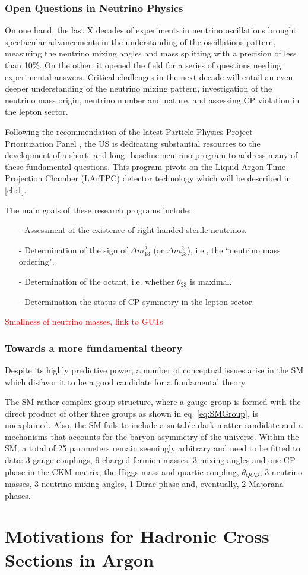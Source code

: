 \subsubsection{Open Questions in Neutrino Physics}
On one hand, the last X decades of experiments in neutrino oscillations brought spectacular advancements in the understanding of the oscillations pattern, measuring the neutrino mixing angles and mass splitting with a precision of less than 10\%.  On the other, it opened the field for a series of questions needing experimental answers. 
Critical challenges in the next decade will entail an even deeper understanding of the neutrino mixing pattern, investigation of the neutrino mass origin, neutrino number and nature, and assessing CP violation in the lepton sector. 


Following the recommendation of the latest Particle Physics Project Prioritization Panel  \cite{P5}, the US  is dedicating substantial resources to the development of a short- and long- baseline neutrino program to address many of these fundamental questions.  This program pivots on the Liquid Argon Time Projection Chamber (LArTPC) detector technology which will be described in \ref{ch:1}.  

The main goals of these research programs include:
\begin{itemize}
\item[-] Assessment of the existence of right-handed sterile neutrinos. 
\item[-] Determination of the sign of $\Delta m^2_{13}$ (or $\Delta m^2_{23}$), i.e., the ``neutrino mass ordering".
\item[-] Determination of the octant, i.e.  whether $\theta_{23}$ is maximal.
\item[-] Determination the status of CP symmetry in the lepton sector.
\end{itemize}

\textcolor{red}{Smallness of neutrino masses, link to GUTs}

\subsubsection{Towards a more fundamental theory}
Despite its highly predictive power, a number of conceptual issues arise in the SM which disfavor it to be a good candidate for a fundamental theory.

The SM rather complex group structure, where a gauge group is formed with the direct product of other three groups as shown in eq. \ref{eq:SMGroup},  is unexplained. Also, the SM fails to include a suitable dark matter candidate and a mechanisms that accounts for the baryon asymmetry of the universe. Within the SM, a total of 25 parameters remain seemingly arbitrary and need to be fitted to data: 3 gauge couplings, 9 charged fermion masses, 3 mixing angles and one CP phase in the CKM matrix, the Higgs mass and quartic coupling, $\theta_{QCD}$, 3 neutrino masses, 3 neutrino mixing angles, 1 Dirac phase and, eventually,  2 Majorana phases.


\section{Motivations for Hadronic Cross Sections in Argon}



